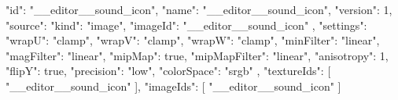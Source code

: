 {
  "id": "__editor__sound_icon",
  "name": "__editor__sound_icon",
  "version": 1,
  "source": {
    "kind": "image",
    "imageId": "__editor__sound_icon"
  },
  "settings": {
    "wrapU": "clamp",
    "wrapV": "clamp",
    "wrapW": "clamp",
    "minFilter": "linear",
    "magFilter": "linear",
    "mipMap": true,
    "mipMapFilter": "linear",
    "anisotropy": 1,
    "flipY": true,
    "precision": "low",
    "colorSpace": "srgb"
  },
  "textureIds": [
    "__editor__sound_icon"
  ],
  "imageIds": [
    "__editor__sound_icon"
  ]
}
